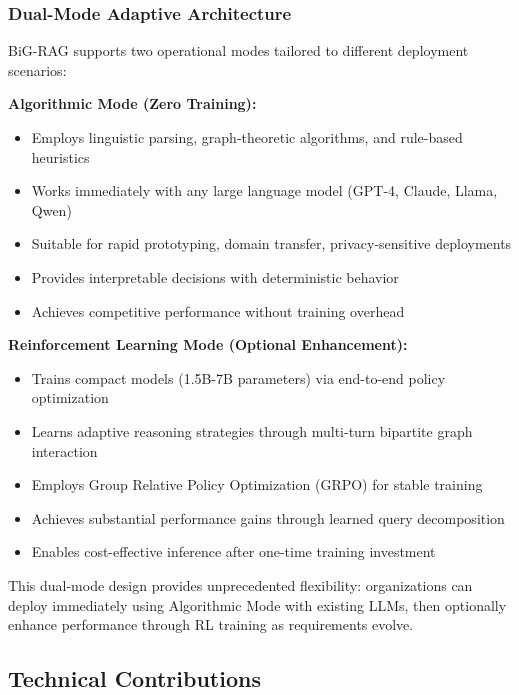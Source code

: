 \documentclass[11pt,a4paper]{article}
\begin{document}
\subsubsection{Dual-Mode Adaptive Architecture}

BiG-RAG supports two operational modes tailored to different deployment scenarios:

\textbf{Algorithmic Mode (Zero Training):}
\begin{itemize}
    \item Employs linguistic parsing, graph-theoretic algorithms, and rule-based heuristics
    \item Works immediately with any large language model (GPT-4, Claude, Llama, Qwen)
    \item Suitable for rapid prototyping, domain transfer, privacy-sensitive deployments
    \item Provides interpretable decisions with deterministic behavior
    \item Achieves competitive performance without training overhead
\end{itemize}

\textbf{Reinforcement Learning Mode (Optional Enhancement):}
\begin{itemize}
    \item Trains compact models (1.5B-7B parameters) via end-to-end policy optimization
    \item Learns adaptive reasoning strategies through multi-turn bipartite graph interaction
    \item Employs Group Relative Policy Optimization (GRPO) for stable training
    \item Achieves substantial performance gains through learned query decomposition
    \item Enables cost-effective inference after one-time training investment
\end{itemize}

This dual-mode design provides unprecedented flexibility: organizations can deploy immediately using Algorithmic Mode with existing LLMs, then optionally enhance performance through RL training as requirements evolve.

\subsection{Technical Contributions}
\end{document}
